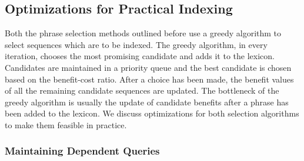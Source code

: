 \subsection{Optimizations for Practical Indexing}
\label{par:optimizations}

 Both the phrase selection methods outlined before use a greedy algorithm to select sequences which are to be indexed. The greedy algorithm, in every iteration, chooses the most promising candidate and adds it to the lexicon. Candidates are maintained in a priority queue and the best candidate is chosen based on the benefit-cost ratio. After a choice has been made, the benefit values of all the remaining candidate sequences are updated. The bottleneck of the greedy algorithm is usually the update
of candidate benefits after a phrase has been added to the
lexicon. We discuss optimizations for both selection algorithms to make them feasible in practice.



\subsubsection{Maintaining Dependent Queries}

